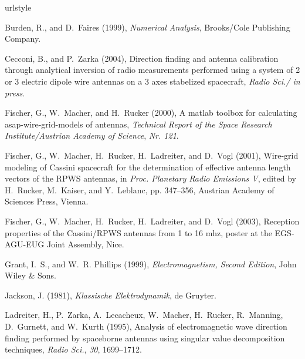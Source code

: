 \documentclass[a4paper,10pt]{thesis}
\begin{document}
\backmatter
\begin{thebibliography}{24}
\providecommand{\natexlab}[1]{#1}
\expandafter\ifx\csname urlstyle\endcsname\relax
  \providecommand{\doi}[1]{doi:\discretionary{}{}{}#1}\else
  \providecommand{\doi}{doi:\discretionary{}{}{}\begingroup
  \urlstyle{rm}\Url}\fi

Burden, R., and D.~Faires (1999), \textit{Numerical Analysis}, Brooks/Cole
  Publishing Company.

Cecconi, B., and P.~Zarka (2004), Direction finding and antenna calibration
  through analytical inversion of radio measurements performed using a system
  of 2 or 3 electric dipole wire antennas on a 3 axes stabelized spacecraft,
  \textit{Radio Sci./ in press}.

Fischer, G., W.~Macher, and H.~Rucker (2000), A matlab toolbox for calculating
  asap-wire-grid-models of antennas, \textit{Technical Report of the Space
  Research Institute/Austrian Academy of Science}, \textit{Nr. 121}.

Fischer, G., W.~Macher, H.~Rucker, H.~Ladreiter, and D.~Vogl (2001), Wire-grid
  modeling of Cassini spacecraft for the determination of effective antenna
  length vectors of the RPWS antennas, in \textit{Proc. Planetary Radio
  Emissions V}, edited by H.~Rucker, M.~Kaiser, and Y.~Leblanc, pp. 347--356,
  Austrian Academy of Sciences Press, Vienna.

Fischer, G., W.~Macher, H.~Rucker, H.~Ladreiter, and D.~Vogl (2003), Reception
  properties of the Cassini/RPWS antennas from 1 to 16 mhz, poster at the
  EGS-AGU-EUG Joint Assembly, Nice.

Grant, I.~S., and W.~R. Phillips (1999), \textit{Electromagnetism, Second
  Edition}, John Wiley \& Sons.

Jackson, J. (1981), \textit{Klassische Elektrodynamik}, de Gruyter.

Ladreiter, H., P.~Zarka, A.~Lecacheux, W.~Macher, H.~Rucker, R.~Manning,
  D.~Gurnett, and W.~Kurth (1995), Analysis of electromagnetic wave direction
  finding performed by spaceborne antennas using singular value decomposition
  techniques, \textit{Radio Sci.}, \textit{30}, 1699--1712.


\end{thebibliography}
\end{document}
